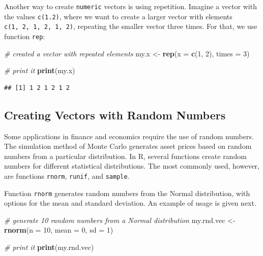 \documentclass[11pt,]{book}
\newenvironment{Shaded}{\begin{snugshade}}{\end{snugshade}}
\newcommand{\KeywordTok}[1]{\textcolor[rgb]{0.27,0.27,0.27}{\textbf{#1}}}
\newcommand{\DataTypeTok}[1]{\textcolor[rgb]{0.27,0.27,0.27}{#1}}
\newcommand{\DecValTok}[1]{\textcolor[rgb]{0.06,0.06,0.06}{#1}}
\newcommand{\StringTok}[1]{\textcolor[rgb]{0.5,0.5,0.5}{#1}}
\newcommand{\CommentTok}[1]{\textcolor[rgb]{0.56,0.35,0.01}{\textit{#1}}}
\newcommand{\NormalTok}[1]{#1}
\begin{document}
Another way to create \texttt{numeric} vectors is using repetition.
Imagine a vector with the values \texttt{c(1.2)}, where we want to
create a larger vector with elements \texttt{c(1,\ 2,\ 1,\ 2,\ 1,\ 2)},
repeating the smaller vector three times. For that, we use function
\texttt{rep}: 

\begin{Shaded}
\begin{Highlighting}[]
\CommentTok{# created a vector with repeated elements}
\NormalTok{my.x <-}\StringTok{ }\KeywordTok{rep}\NormalTok{(}\DataTypeTok{x =} \KeywordTok{c}\NormalTok{(}\DecValTok{1}\NormalTok{, }\DecValTok{2}\NormalTok{), }\DataTypeTok{times =} \DecValTok{3}\NormalTok{)}

\CommentTok{# print it}
\KeywordTok{print}\NormalTok{(my.x)}
\end{Highlighting}
\end{Shaded}

\begin{verbatim}
## [1] 1 2 1 2 1 2
\end{verbatim}

\subsection{Creating Vectors with Random
Numbers}\label{creating-vectors-with-random-numbers}

Some applications in finance and economics require the use of random
numbers. The simulation method of Monte Carlo generates asset prices
based on random numbers from a particular distribution. In R, several
functions create random numbers for different statistical distributions.
The most commonly used, however, are functions \texttt{rnorm},
\texttt{runif}, and \texttt{sample}. 
 

Function \texttt{rnorm} generates random numbers from the Normal
distribution, with options for the mean and standard deviation. An
example of usage is given next.

\begin{Shaded}
\begin{Highlighting}[]
\CommentTok{# generate 10 random numbers from a Normal distribution}
\NormalTok{my.rnd.vec <-}\StringTok{ }\KeywordTok{rnorm}\NormalTok{(}\DataTypeTok{n =} \DecValTok{10}\NormalTok{, }\DataTypeTok{mean =} \DecValTok{0}\NormalTok{, }\DataTypeTok{sd =} \DecValTok{1}\NormalTok{)}

\CommentTok{# print it}
\KeywordTok{print}\NormalTok{(my.rnd.vec)}
\end{Highlighting}
\end{Shaded}
\end{document}
